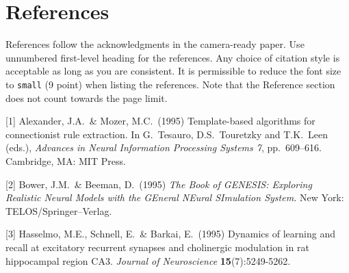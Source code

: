 \documentclass{article}
\begin{document}
\section*{References}


References follow the acknowledgments in the camera-ready paper. Use unnumbered first-level heading for
the references. Any choice of citation style is acceptable as long as you are
consistent. It is permissible to reduce the font size to \verb+small+ (9 point)
when listing the references.
Note that the Reference section does not count towards the page limit.
\medskip


{
\small


[1] Alexander, J.A.\ \& Mozer, M.C.\ (1995) Template-based algorithms for
connectionist rule extraction. In G.\ Tesauro, D.S.\ Touretzky and T.K.\ Leen
(eds.), {\it Advances in Neural Information Processing Systems 7},
pp.\ 609--616. Cambridge, MA: MIT Press.


[2] Bower, J.M.\ \& Beeman, D.\ (1995) {\it The Book of GENESIS: Exploring
  Realistic Neural Models with the GEneral NEural SImulation System.}  New York:
TELOS/Springer--Verlag.


[3] Hasselmo, M.E., Schnell, E.\ \& Barkai, E.\ (1995) Dynamics of learning and
recall at excitatory recurrent synapses and cholinergic modulation in rat
hippocampal region CA3. {\it Journal of Neuroscience} {\bf 15}(7):5249-5262.
}

\end{document}
